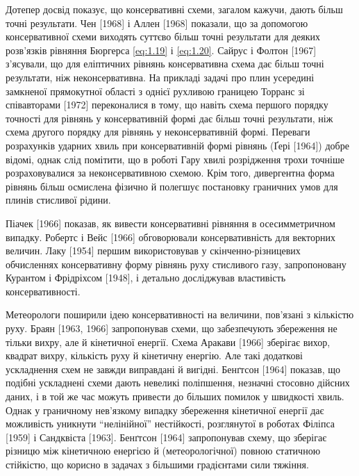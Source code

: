 Дотепер досвід показує, що консервативні схеми, загалом кажучи, дають більш точні результати. Чен [1968] і Аллен [1968] показали, що за допомогою консервативної схеми виходять суттєво більш точні результати для деяких розв'язків рівняння Бюргерса \eqref{eq:1.19} і \eqref{eq:1.20}. Сайрус і Фолтон [1967] з'ясували, що для еліптичних рівнянь консервативна схема дає більш точні результати, ніж неконсервативна. На прикладі задачі про плин усередині замкненої прямокутної області з однієї рухливою границею Торранс зі співавторами [1972] переконалися в тому, що навіть схема першого порядку точності для рівнянь у консервативній формі дає більш точні результати, ніж схема другого порядку для рівнянь у неконсервативній формі. Переваги розрахунків ударних хвиль при консервативній формі рівнянь (Ґері [1964]) добре відомі, однак слід помітити, що в роботі Гару хвилі розрідження трохи точніше розраховувалися за неконсервативною схемою. Крім того, дивергентна форма рівнянь більш осмислена фізично й полегшує постановку граничних умов для плинів стисливої рідини. \medskip

Піачек [1966] показав, як вивести консервативні рівняння в осесимметричном випадку. Робертс і Вейс [1966] обговорювали консервативність для векторних величин. Лаку [1954] першим використовував у скінченно-різницевих обчисленнях консервативну форму рівнянь руху стисливого газу, запропоновану Курантом і Фрідріхсом [1948], і детально досліджував властивість консервативності. \medskip

Метеорологи поширили ідею консервативності на величини, пов'язані з кількістю руху. Браян [1963, 1966] запропонував схеми, що забезпечують збереження не тільки вихру, але й кінетичної енергії. Схема Аракави [1966] зберігає вихор, квадрат вихру, кількість руху й кінетичну енергію. Але такі додаткові ускладнення схем не завжди виправдані й вигідні. Бенґтсон [1964] показав, що подібні ускладнені схеми дають невеликі поліпшення, незначні стосовно дійсних даних, і в той же час можуть привести до більших помилок у швидкості хвиль. Однак у граничному нев'язкому випадку збереження кінетичної енергії дає можливість уникнути ``нелінійної'' нестійкості, розглянутої в роботах Філіпса [1959] і Сандквіста [1963]. Бенґтсон [1964] запропонував схему, що зберігає різницю між кінетичною енергією й (метеорологічної) повною статичною стійкістю, що корисно в задачах з більшими градієнтами сили тяжіння. \medskip

